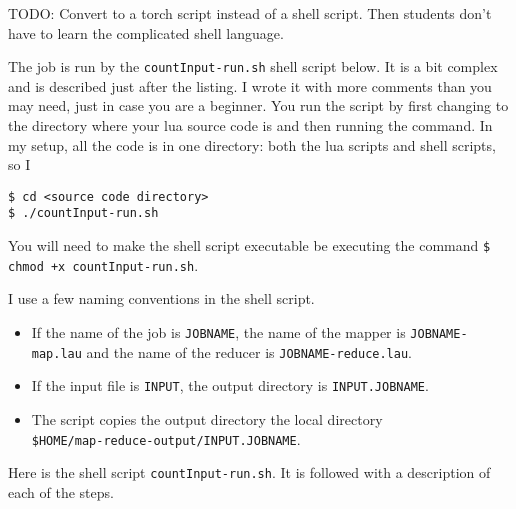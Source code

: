 \documentclass{article}
\let\code\texttt %
\begin{document}
{TODO: Convert to a torch script instead of a shell script. Then students
don't have to learn the complicated shell language.

The job is run by the \code{countInput-run.sh} shell script below. It is
a bit complex and is described just after the listing. I wrote it with
more comments than you may need, just in case you are a beginner. You
run the script by first changing to the directory where your lua source
code is and then running the command. In my setup, all the code is in
one directory: both the lua scripts and shell scripts, so I 

\begin{verbatim}
$ cd <source code directory>
$ ./countInput-run.sh
\end{verbatim}

You will need to make the shell script executable be executing the
command \code{\$ chmod +x countInput-run.sh}. 

I use a few naming conventions in the shell script.
\begin{itemize}
  \item If the name of the job is \code{JOBNAME}, the name of the mapper
    is \code{JOBNAME-map.lau} and the name of the reducer is
    \code{JOBNAME-reduce.lau}.
  \item If the input file is \code{INPUT}, the output directory is
    \code{INPUT.JOBNAME}.
  \item The script copies the output directory the local directory\\
    \code{\$HOME/map-reduce-output/INPUT.JOBNAME}.
\end{itemize}

Here is the shell script \code{countInput-run.sh}. It is followed with a
description of each of the steps.



}
\end{document}
